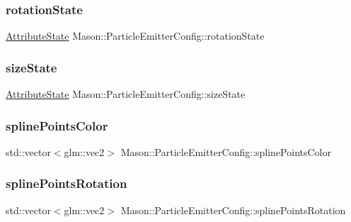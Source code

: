 \subsubsection{\texorpdfstring{rotation\+State}{rotationState}}
{\footnotesize\ttfamily \hyperlink{namespace_mason_aefc2ce7d9295b57af46ab6c8ebfc32f7}{Attribute\+State} Mason\+::\+Particle\+Emitter\+Config\+::rotation\+State}

\hypertarget{struct_mason_1_1_particle_emitter_config_a3f6f8e64ff56799d85b8512aa97801eb}{}\label{struct_mason_1_1_particle_emitter_config_a3f6f8e64ff56799d85b8512aa97801eb} 
\subsubsection{\texorpdfstring{size\+State}{sizeState}}
{\footnotesize\ttfamily \hyperlink{namespace_mason_aefc2ce7d9295b57af46ab6c8ebfc32f7}{Attribute\+State} Mason\+::\+Particle\+Emitter\+Config\+::size\+State}

\hypertarget{struct_mason_1_1_particle_emitter_config_a66a4652dce73b58e27b8a495e2b6e0eb}{}\label{struct_mason_1_1_particle_emitter_config_a66a4652dce73b58e27b8a495e2b6e0eb} 
\subsubsection{\texorpdfstring{spline\+Points\+Color}{splinePointsColor}}
{\footnotesize\ttfamily std\+::vector$<$glm\+::vec2$>$ Mason\+::\+Particle\+Emitter\+Config\+::spline\+Points\+Color}

\hypertarget{struct_mason_1_1_particle_emitter_config_ae03fbdb37c6738eafedc10564d744e8e}{}\label{struct_mason_1_1_particle_emitter_config_ae03fbdb37c6738eafedc10564d744e8e} 
\subsubsection{\texorpdfstring{spline\+Points\+Rotation}{splinePointsRotation}}
{\footnotesize\ttfamily std\+::vector$<$glm\+::vec2$>$ Mason\+::\+Particle\+Emitter\+Config\+::spline\+Points\+Rotation}


